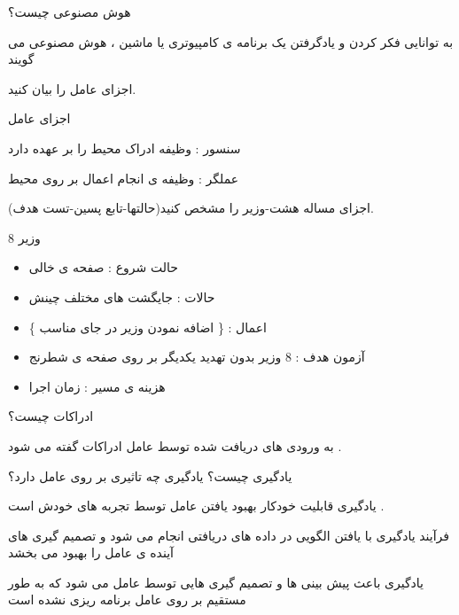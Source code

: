 \documentclass[12pt]{article}
\begin{document}
\noindent
هوش مصنوعی چیست؟



\begin{tcolorbox}
به توانایی فکر کردن و یادگرفتن یک برنامه ی کامپیوتری یا ماشین  ، هوش مصنوعی می گویند 
\end{tcolorbox}


\vspace{20pt}
\noindent
اجزای عامل را بیان کنید.


\begin{tcolorbox}
اجزای عامل

\noindent
سنسور 
 : وظیفه ادراک محیط را بر عهده دارد
 
 
\noindent
عملگر 
: وظیفه ی انجام اعمال بر روی محیط
\end{tcolorbox}



\vspace{20pt}
\noindent
اجزای مساله هشت-وزیر را مشخص کنید(حالتها-تابع پسین-تست هدف).



\begin{tcolorbox}
8 وزیر

\begin{itemize}
	\item حالت شروع : صفحه ی خالی
	\item حالات : جایگشت های مختلف چینش
	\item اعمال :
	\{ اضافه نمودن وزیر در جای مناسب \}
	\item آزمون هدف : 8 وزیر بدون تهدید یکدیگر بر روی صفحه ی شطرنج
	\item هزینه ی مسیر : زمان اجرا
\end{itemize}
\end{tcolorbox}



\vspace{20pt}
\noindent
ادراکات چیست؟


\begin{tcolorbox}
به ورودی های دریافت شده توسط عامل ادراکات گفته می شود .
\end{tcolorbox}



\newpage
\vspace{20pt}
\noindent
یادگیری چیست؟ یادگیری چه تاثیری بر روی عامل دارد؟




\begin{tcolorbox}
یادگیری قابلیت خودکار بهبود یافتن عامل توسط تجربه های خودش است .

\vspace{10pt}

فرآیند یادگیری با یافتن الگویی در داده های دریافتی انجام می شود و تصمیم گیری های آینده ی عامل را بهبود می بخشد 

\vspace{10pt}

یادگیری باعث پیش بینی ها و تصمیم گیری هایی توسط عامل می شود که به طور مستقیم بر روی عامل برنامه ریزی نشده است
\end{tcolorbox}
\end{document}
